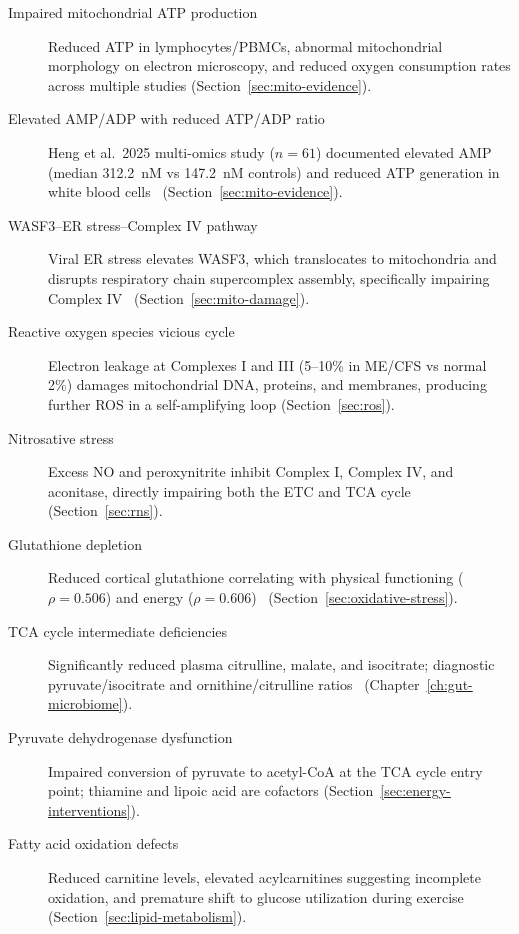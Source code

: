 \begin{description}
    \item[Impaired mitochondrial ATP production] Reduced ATP in lymphocytes/PBMCs, abnormal mitochondrial morphology on electron microscopy, and reduced oxygen consumption rates across multiple studies (Section~\ref{sec:mito-evidence}).

    \item[Elevated AMP/ADP with reduced ATP/ADP ratio] Heng et al.\ 2025 multi-omics study ($n=61$) documented elevated AMP (median 312.2~nM vs 147.2~nM controls) and reduced ATP generation in white blood cells~\cite{heng2025mecfs} (Section~\ref{sec:mito-evidence}).

    \item[WASF3--ER stress--Complex IV pathway] Viral ER stress elevates WASF3, which translocates to mitochondria and disrupts respiratory chain supercomplex assembly, specifically impairing Complex IV~\cite{wang2023wasf3} (Section~\ref{sec:mito-damage}).

    \item[Reactive oxygen species vicious cycle] Electron leakage at Complexes I and III (5--10\% in ME/CFS vs normal 2\%) damages mitochondrial DNA, proteins, and membranes, producing further ROS in a self-amplifying loop (Section~\ref{sec:ros}).

    \item[Nitrosative stress] Excess NO and peroxynitrite inhibit Complex I, Complex IV, and aconitase, directly impairing both the ETC and TCA cycle (Section~\ref{sec:rns}).

    \item[Glutathione depletion] Reduced cortical glutathione correlating with physical functioning ($\rho=0.506$) and energy ($\rho=0.606$)~\cite{Shungu2012glutathione} (Section~\ref{sec:oxidative-stress}).

    \item[TCA cycle intermediate deficiencies] Significantly reduced plasma citrulline, malate, and isocitrate; diagnostic pyruvate/isocitrate and ornithine/citrulline ratios~\cite{Yamano2016tca_urea} (Chapter~\ref{ch:gut-microbiome}).

    \item[Pyruvate dehydrogenase dysfunction] Impaired conversion of pyruvate to acetyl-CoA at the TCA cycle entry point; thiamine and lipoic acid are cofactors (Section~\ref{sec:energy-interventions}).

    \item[Fatty acid oxidation defects] Reduced carnitine levels, elevated acylcarnitines suggesting incomplete oxidation, and premature shift to glucose utilization during exercise (Section~\ref{sec:lipid-metabolism}).


\end{description}
